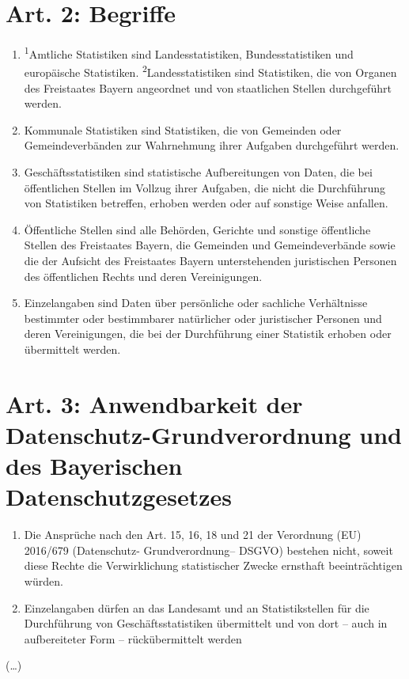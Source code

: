 \documentclass[A4, 12pt]{scrbook}
\begin{document}
    \section{Art. 2: Begriffe}
        \begin{enumerate}[label=(\arabic*)]
            \item \textsuperscript{1}Amtliche Statistiken sind Landesstatistiken, Bundesstatistiken und europäische Statistiken. \textsuperscript{2}Landesstatistiken sind Statistiken, die von Organen des Freistaates Bayern angeordnet und von staatlichen Stellen durchgeführt werden.
            \item Kommunale Statistiken sind Statistiken, die von Gemeinden oder Gemeindever\-bän\-den zur Wahrnehmung ihrer Aufgaben durchgeführt werden.
            \item Geschäftsstatistiken sind statistische Aufbereitungen von Daten, die bei öffentli\-chen Stellen im Vollzug ihrer Aufgaben, die nicht die Durchführung von Statistiken betreffen, erhoben werden oder auf sonstige Weise anfallen.
            \item Öffentliche Stellen sind alle Behörden, Gerichte und sonstige öffentliche Stellen des Freistaates Bayern, die Gemeinden und Gemeindeverbände sowie die der Aufsicht des Freistaates Bayern unterstehenden juristischen Personen des öffentlichen Rechts und deren Vereinigungen.
            \item Einzelangaben sind Daten über persönliche oder sachliche Verhältnisse bestimmter oder bestimmbarer natürlicher oder juristischer Personen und deren Vereinigungen, die bei der Durchführung einer Statistik erhoben oder übermittelt werden.
        \end{enumerate}
    \section[Art. 3: EU-DSGVO und BayDatSchG]{Art. 3: Anwendbarkeit der Datenschutz-Grundverordnung und des Bayerischen Datenschutzgesetzes}
        \begin{enumerate}[label=(\arabic*)]
            \item Die Ansprüche nach den Art. 15, 16, 18 und 21 der Verordnung (EU) 2016/679 (Datenschutz- Grundverordnung– DSGVO) bestehen nicht, soweit diese Rechte die Verwirklichung statistischer Zwecke ernsthaft beeinträchtigen würden.
            \item Einzelangaben dürfen an das Landesamt und an Statistikstellen für die Durch\-füh\-rung von Geschäftsstatistiken übermittelt und von dort – auch in aufbereiteter Form – rückübermittelt werden
        \end{enumerate}
    (\dots)
\end{document}
